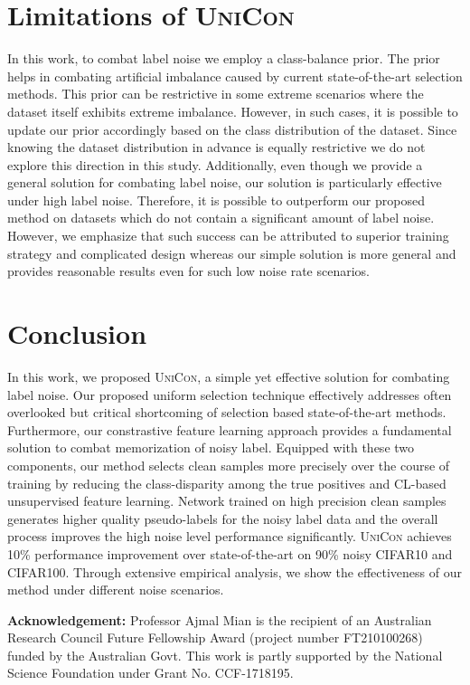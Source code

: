 \documentclass[10pt,twocolumn,letterpaper]{article}
\begin{document}
\section{Limitations of \textsc{UniCon}}
In this work, to combat label noise we employ a class-balance prior. The prior helps in combating artificial imbalance caused by current state-of-the-art selection methods. This prior can be restrictive in some extreme scenarios where the dataset itself exhibits extreme imbalance. However, in such cases, it is possible to update our prior accordingly based on the class distribution of the dataset. Since knowing the dataset distribution in advance is equally restrictive we do not explore this direction in this study. Additionally, even though we provide a general solution for combating label noise, our solution is particularly effective under high label noise. Therefore, it is possible to outperform our proposed method on datasets which do not contain a significant amount of label noise. However, we emphasize that such success can be attributed to superior training strategy and complicated design whereas our simple solution is more general and provides reasonable results even for such low noise rate scenarios.  
\section{Conclusion}
In this work, we proposed \textsc{UniCon}, a simple yet effective solution for combating label noise. Our proposed uniform selection technique effectively addresses often overlooked but critical shortcoming of selection based state-of-the-art methods. Furthermore, our constrastive feature learning approach provides a fundamental solution to combat memorization of noisy label. Equipped with these two components, our method selects clean samples more precisely over the course of training by reducing the class-disparity among the true positives and CL-based unsupervised feature learning. Network trained on high precision clean samples generates higher quality pseudo-labels for the noisy label data and the overall process improves the high noise level performance significantly. \textsc{UniCon} achieves  10\% performance improvement over state-of-the-art on 90\% noisy CIFAR10 and CIFAR100. Through extensive empirical analysis, we show the effectiveness of our method under different noise scenarios. 

\textbf{Acknowledgement:} Professor Ajmal Mian is the recipient of an Australian Research Council Future Fellowship Award (project number FT210100268) funded by the Australian Govt. This work is partly supported by the National Science Foundation under Grant No. CCF-1718195. 
\end{document}
